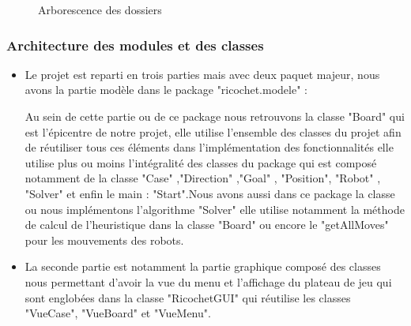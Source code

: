 \documentclass[a4paper]{article} %
\begin{document}
\begin{figure}[h]
\begin{center}
\end{center}
\caption{Arborescence des dossiers}
\end{figure}
\subsubsection{Architecture des modules et des classes}
\begin{itemize}
\item Le projet est reparti en trois  parties mais avec deux paquet majeur, nous avons la partie modèle dans le package "ricochet.modele" : 

Au sein de cette partie ou de ce package nous retrouvons la classe "Board" qui est l'épicentre de notre projet, elle utilise l'ensemble des classes du projet afin de réutiliser tous ces éléments dans l’implémentation des fonctionnalités elle utilise plus ou moins l'intégralité des classes du package qui est composé notamment de la classe "Case" ,"Direction" ,"Goal" , "Position", "Robot" , "Solver" et enfin le main : "Start".Nous avons aussi dans ce package la classe  ou nous implémentons l'algorithme "Solver" elle utilise notamment la méthode de calcul de l'heuristique dans la classe "Board" ou encore le "getAllMoves" pour les mouvements des robots.

\item La seconde partie est notamment la partie graphique composé des classes nous permettant d'avoir la vue du menu et l'affichage du plateau de jeu qui sont englobées dans la classe "RicochetGUI" qui réutilise les classes "VueCase", "VueBoard" et "VueMenu".
\end{itemize}
\end{document}
